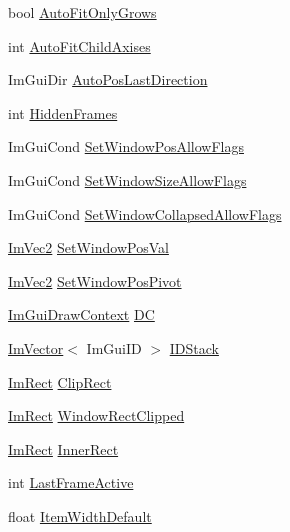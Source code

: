 \begin{DoxyCompactItemize}
\item 
bool \hyperlink{struct_im_gui_window_a3583d20a57fea8c8491f14f2dcda483c}{Auto\+Fit\+Only\+Grows}
\item 
int \hyperlink{struct_im_gui_window_ad323df685c026a4557912a5090414abe}{Auto\+Fit\+Child\+Axises}
\item 
Im\+Gui\+Dir \hyperlink{struct_im_gui_window_aa8219e984ed273d6cfd19fb4b93eff5e}{Auto\+Pos\+Last\+Direction}
\item 
int \hyperlink{struct_im_gui_window_a91f60ca5e2e9ff4c34957e7cc239193e}{Hidden\+Frames}
\item 
Im\+Gui\+Cond \hyperlink{struct_im_gui_window_a8ff69a8bdc9221c9cc7d8ba656013d84}{Set\+Window\+Pos\+Allow\+Flags}
\item 
Im\+Gui\+Cond \hyperlink{struct_im_gui_window_a0c9419d95253214cb2a71d6ead1e03d6}{Set\+Window\+Size\+Allow\+Flags}
\item 
Im\+Gui\+Cond \hyperlink{struct_im_gui_window_a48384a3767252325e5c71b534adc58a9}{Set\+Window\+Collapsed\+Allow\+Flags}
\item 
\hyperlink{struct_im_vec2}{Im\+Vec2} \hyperlink{struct_im_gui_window_a6caed47ef8e25a2e7a68a6be72c5716a}{Set\+Window\+Pos\+Val}
\item 
\hyperlink{struct_im_vec2}{Im\+Vec2} \hyperlink{struct_im_gui_window_a4de5608bf44728447327d832fa84f0c9}{Set\+Window\+Pos\+Pivot}
\item 
\hyperlink{struct_im_gui_draw_context}{Im\+Gui\+Draw\+Context} \hyperlink{struct_im_gui_window_a3a20c68996093058481ae8e174258a04}{DC}
\item 
\hyperlink{class_im_vector}{Im\+Vector}$<$ Im\+Gui\+ID $>$ \hyperlink{struct_im_gui_window_a1a71724c43e37830ed9b38bd34f26917}{I\+D\+Stack}
\item 
\hyperlink{struct_im_rect}{Im\+Rect} \hyperlink{struct_im_gui_window_a9950a40b18de2579c4d3deb0ab33f455}{Clip\+Rect}
\item 
\hyperlink{struct_im_rect}{Im\+Rect} \hyperlink{struct_im_gui_window_ae0af9ff6c93baad6848143dd9d742ddd}{Window\+Rect\+Clipped}
\item 
\hyperlink{struct_im_rect}{Im\+Rect} \hyperlink{struct_im_gui_window_a0fd27908ebffb5d9509dc9e7f199d67d}{Inner\+Rect}
\item 
int \hyperlink{struct_im_gui_window_a6f3c194efabb4fd0a99be45fa5fe26f1}{Last\+Frame\+Active}
\item 
float \hyperlink{struct_im_gui_window_a5e6be361ee0c71a22a1ff68f6dbf09ff}{Item\+Width\+Default}
\item 

\end{DoxyCompactItemize}

